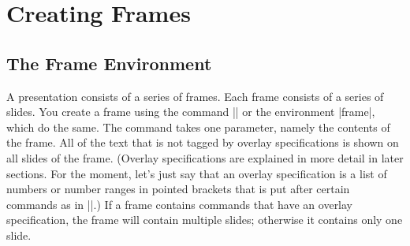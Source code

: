 
%

\section{Creating Frames}

\label{section-frames}

\subsection{The Frame Environment}

A presentation consists of a series of frames. Each frame consists of
a series of slides. You create a frame using the command
|\frame| or the environment |frame|, which do the same. The command
takes one parameter, namely the contents of the frame. All of the
text that is not tagged by overlay specifications is shown on all
slides of the frame. (Overlay specifications are explained
in more detail in later sections. For the moment, let's just say
that an overlay specification is a list of numbers or number ranges in
pointed brackets that is put after certain commands as in
||.) If a frame contains commands that have an
overlay specification, the frame will contain multiple slides;
otherwise it contains only one slide.

